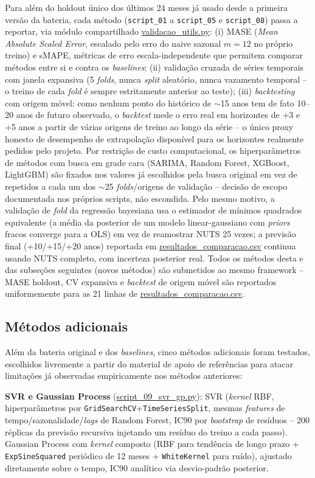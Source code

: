 Para além do holdout único dos últimos 24 meses já usado desde a primeira versão da bateria, cada método (\texttt{script\_01} a \texttt{script\_05} e \texttt{script\_08}) passa a reportar, via módulo compartilhado \url{validacao_utils.py}: (i) MASE (\textit{Mean Absolute Scaled Error}, escalado pelo erro do naive sazonal $m=12$ no próprio treino) e sMAPE, métricas de erro escala-independente que permitem comparar métodos entre si e contra os \textit{baselines}; (ii) validação cruzada de séries temporais com janela expansiva (5 \textit{folds}, nunca \textit{split} aleatório, nunca vazamento temporal -- o treino de cada \textit{fold} é sempre estritamente anterior ao teste); (iii) \textit{backtesting} com origem móvel: como nenhum ponto do histórico de $\sim$15 anos tem de fato 10--20 anos de futuro observado, o \textit{backtest} mede o erro real em horizontes de +3 e +5 anos a partir de várias origens de treino ao longo da série -- o único proxy honesto de desempenho de extrapolação disponível para os horizontes realmente pedidos pelo projeto. Por restrição de custo computacional, os hiperparâmetros de métodos com busca em grade cara (SARIMA, Random Forest, XGBoost, LightGBM) são fixados nos valores já escolhidos pela busca original em vez de repetidos a cada um dos $\sim$25 \textit{folds}/origens de validação -- decisão de escopo documentada nos próprios scripts, não escondida. Pelo mesmo motivo, a validação de \textit{fold} da regressão bayesiana usa o estimador de mínimos quadrados equivalente (a média da posterior de um modelo linear-gaussiano com \textit{priors} fracos converge para a OLS) em vez de reamostrar NUTS 25 vezes; a previsão final (+10/+15/+20 anos) reportada em \url{resultados_comparacao.csv} continua usando NUTS completo, com incerteza posterior real. Todos os métodos desta e das subseções seguintes (novos métodos) são submetidos ao mesmo framework -- MASE holdout, CV expansiva e \textit{backtest} de origem móvel são reportados uniformemente para as 21 linhas de \url{resultados_comparacao.csv}.

\subsection{Métodos adicionais}

Além da bateria original e dos \textit{baselines}, cinco métodos adicionais foram testados, escolhidos livremente a partir do material de apoio de referências para atacar limitações já observadas empiricamente nos métodos anteriores:

\textbf{SVR e Gaussian Process} (\url{script_09_svr_gp.py}): SVR (\textit{kernel} RBF, hiperparâmetros por \texttt{GridSearchCV}+\texttt{TimeSeriesSplit}, mesmas \textit{features} de tempo/sazonalidade/\textit{lags} de Random Forest, IC90 por \textit{bootstrap} de resíduos -- 200 réplicas da previsão recursiva injetando um resíduo do treino a cada passo). Gaussian Process com \textit{kernel} composto (RBF para tendência de longo prazo + \texttt{ExpSineSquared} periódico de 12 meses + \texttt{WhiteKernel} para ruído), ajustado diretamente sobre o tempo, IC90 analítico via desvio-padrão posterior.

